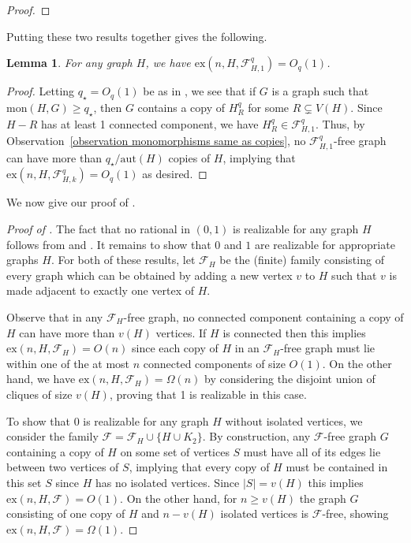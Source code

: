 \documentclass[12pt,letterpaper]{article}
\newtheorem{lemma}[theorem]{Lemma}
\theoremstyle{definition}
\newcommand{\pow}{q} %
\newcommand{\Pow}{{q_\star}} %
\newcommand{\ex}{\mathrm{ex}}
\renewcommand{\c}[1]{\mathcal{#1}}
\newcommand{\Om}{\Omega}
\begin{document}
\begin{proof}
		
	\end{proof}
	
	Putting these two results together gives the following.
	
	\begin{lemma}\label{proposition FH1 Bounded} 
		For any graph $H$, we have $\ex(n,H,\c{F}_{H,1}^q)=O_q(1)$.
	\end{lemma}
	\begin{proof}
		Letting $\Pow=O_{\pow}(1)$ be as in , we see that if $G$ is a graph such that $\mathrm{mon}(H,G)\geq \Pow$, then $G$ contains a copy of $H_R^\pow$ for some $R\subsetneq V(H)$. Since $H-R$ has at least 1 connected component, we have $H_R^\pow\in \c{F}_{H,1}^\pow$. Thus, by Observation~\ref{observation monomorphisms same as copies}, no $\c{F}_{H,1}^\pow$-free graph can have more than $\Pow/\mathrm{aut}(H)$ copies of $H$, implying that $\ex(n,H,\c{F}_{H,k}^\pow)=O_q(1)$ as desired.
	\end{proof}
	
	We now give our proof of .
	\begin{proof}[Proof of ]
		The fact that no rational in $(0,1)$ is realizable for any graph $H$ follows from  and .  It remains to show that $0$ and $1$ are realizable for appropriate graphs $H$.  For both of these results, let $\c{F}_H$ be the (finite) family consisting of every graph which can be obtained by adding a new vertex $v$ to $H$ such that $v$ is made adjacent to exactly one vertex of $H$.  
		
		Observe that in any $\c{F}_H$-free graph, no connected component containing a copy of $H$ can have more than $v(H)$ vertices.  If $H$ is connected then this implies $\ex(n,H,\c{F}_H)=O(n)$ since each copy of $H$ in an $\c{F}_H$-free graph must lie within one of the at most $n$ connected components of size $O(1)$.  On the other hand, we have $\ex(n,H,\c{F}_H)=\Om(n)$ by considering the disjoint union of cliques of size $v(H)$, proving that 1 is realizable in this case.
		
		To show that $0$ is realizable for any graph $H$ without isolated vertices, we consider the family $\c{F}=\c{F}_H\cup \{H\cup K_2\}$.  By construction, any $\c{F}$-free graph $G$ containing a copy of $H$ on some set of vertices $S$ must have all of its edges lie between two vertices of $S$, implying that every copy of $H$ must be contained in this set $S$ since $H$ has no isolated vertices.  Since $|S|=v(H)$ this implies $\ex(n,H,\c{F})=O(1)$.  On the other hand, for $n\ge v(H)$ the graph $G$ consisting of one copy of $H$ and $n-v(H)$ isolated vertices is $\c{F}$-free, showing $\ex(n,H,\c{F})=\Om(1)$.
	\end{proof}
	
\end{document}
